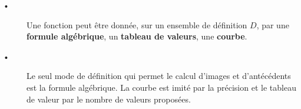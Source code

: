  
 

\begin{Rqs}
\begin{description}
\item[•] Une fonction peut être donnée, sur un ensemble de définition $D$, par une \textbf{formule algébrique}, un \textbf{tableau de valeurs}, une \textbf{courbe}. 
\item[•] Le seul mode de définition qui permet le calcul d'images et d'antécédents est la formule algébrique. La courbe est imité par la précision et le tableau de valeur par le nombre de valeurs proposées.
\end{description}
\end{Rqs}


